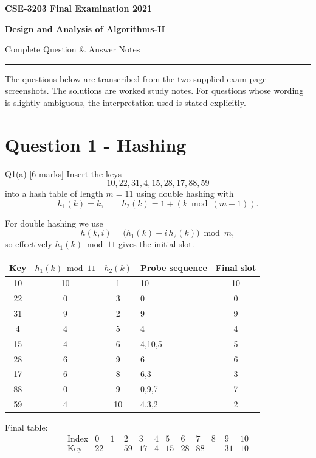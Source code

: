 \documentclass[10.5pt,a4paper]{article}
\begin{document}
\begin{center}
{\LARGE\bfseries\color{primary} CSE-3203 Final Examination 2021}\par
\vspace{2mm}
{\Large\bfseries Design and Analysis of Algorithms-II}\par
\vspace{1mm}
{\large Complete Question \& Answer Notes}\par
\vspace{3mm}
\rule{0.9\textwidth}{0.6pt}
\end{center}

\begin{examtip}
The questions below are transcribed from the two supplied exam-page screenshots. The solutions are worked study notes. For questions whose wording is slightly ambiguous, the interpretation used is stated explicitly.
\end{examtip}

\tableofcontents
\newpage

\section{Question 1 - Hashing}

\begin{questionbox}{Q1(a) [6 marks]}
Insert the keys
\[
10,22,31,4,15,28,17,88,59
\]
into a hash table of length \(m=11\) using double hashing with
\[
h_1(k)=k,\qquad h_2(k)=1+(k\bmod (m-1)).
\]
\end{questionbox}

\begin{answerbox}
For double hashing we use
\[
h(k,i)=\bigl(h_1(k)+i\,h_2(k)\bigr)\bmod m,
\]
so effectively \(h_1(k)\bmod 11\) gives the initial slot.

\begin{center}
\small
\begin{tabular}{c c c l c}
\toprule
Key & \(h_1(k)\bmod11\) & \(h_2(k)\) & Probe sequence & Final slot\\
\midrule
10 & 10 & 1  & 10 & 10\\
22 & 0  & 3  & 0 & 0\\
31 & 9  & 2  & 9 & 9\\
4  & 4  & 5  & 4 & 4\\
15 & 4  & 6  & 4,10,5 & 5\\
28 & 6  & 9  & 6 & 6\\
17 & 6  & 8  & 6,3 & 3\\
88 & 0  & 9  & 0,9,7 & 7\\
59 & 4  & 10 & 4,3,2 & 2\\
\bottomrule
\end{tabular}
\end{center}

Final table:
\[
\begin{array}{c|ccccccccccc}
\text{Index} &0&1&2&3&4&5&6&7&8&9&10\\ \hline
\text{Key} &22&-&59&17&4&15&28&88&-&31&10
\end{array}
\]
\end{answerbox}
\end{document}
